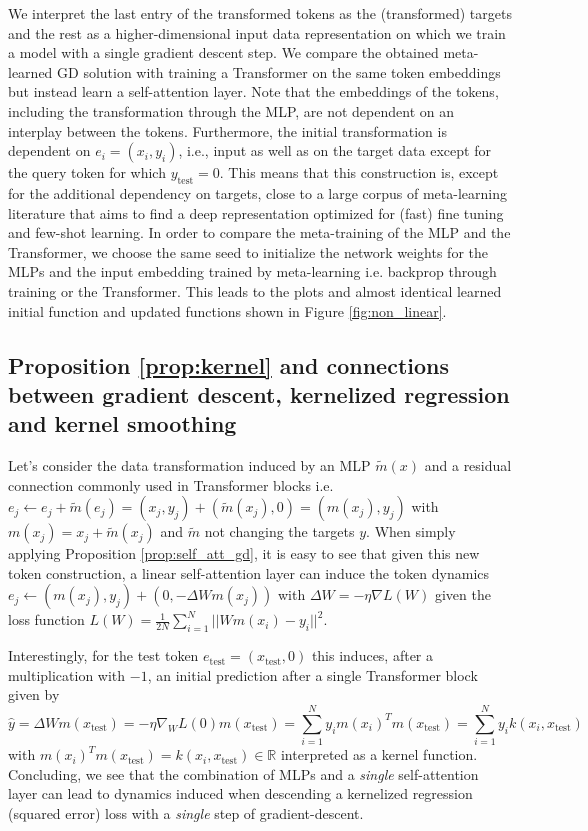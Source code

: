 \documentclass{article}
\theoremstyle{plain}
\theoremstyle{definition}
\theoremstyle{remark}
\begin{document}
We interpret the last entry of the transformed tokens as the (transformed) targets and the rest as a higher-dimensional input data representation on which we train a model with a single gradient descent step. We compare the obtained meta-learned GD solution with training a Transformer on the same token embeddings but instead learn a self-attention layer. Note that the embeddings of the tokens, including the transformation through the MLP, are not dependent on an interplay between the tokens. Furthermore, the initial transformation is dependent on $e_i = (x_i, y_i)$, i.e., input as well as on the target data except for the query token for which $y_{\text{test}}=0$. This means that this construction is, except for the additional dependency on targets, close to a large corpus of meta-learning literature that aims to find a deep representation optimized for (fast) fine tuning and few-shot learning.
In order to compare the meta-training of the MLP and the Transformer, we choose the same seed to initialize the network weights for the MLPs and the input embedding trained by meta-learning i.e. backprop through training or the Transformer. This leads to the plots and almost identical learned initial function and updated functions shown in Figure \ref{fig:non_linear}.

\subsection{Proposition \ref{prop:kernel} and connections between gradient descent, kernelized regression and kernel smoothing}
\label{app:ker_reg}

Let's consider the data transformation induced by an MLP $\tilde{m}(x)$ and a residual connection commonly used in Transformer blocks i.e. $e_j \leftarrow e_j + \tilde{m}(e_j) = (x_j, y_j) + (\tilde{m}(x_j), 0) = (m(x_j), y_j)$ with $m(x_j) = x_j + \tilde{m}(x_j)$ and $\tilde{m}$ not changing the targets $y$. When simply applying Proposition \ref{prop:self_att_gd}, it is easy to see that given this new token construction, a linear self-attention layer can induce the token dynamics $e_j \leftarrow (m(x_j), y_j) + (0, -\Delta W m(x_j))$ with $\Delta W = -\eta \nabla L(W)$ given the loss function $L(W) = \frac{1}{2N}\sum_{i=1}^N||W m(x_i)  -y_i||^2$.

Interestingly, for the test token $e_{\text{test}} = (x_{\text{test}}, 0)$ this induces, after a multiplication with $-1$, an initial prediction after a single Transformer block given by
\begin{equation}
    \hat{y} = \Delta W m(x_{\text{test}}) = -\eta \nabla_W L(0) m(x_{\text{test}}) = \sum_{i=1}^N y_i m(x_i)^Tm(x_{\text{test}}) = \sum_{i=1}^N y_i k(x_i, x_{\text{test}})
\end{equation}
with $m(x_i)^Tm(x_{\text{test}})=k(x_i, x_{\text{test}}) \in\mathbb{R}$ interpreted as a kernel function.
Concluding, we see that the combination of MLPs and a \textit{single} self-attention layer can lead to dynamics induced when descending a kernelized regression (squared error) loss with a \textit{single} step of gradient-descent. 
\end{document}

